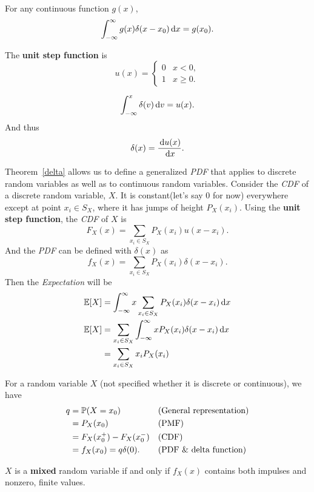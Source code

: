 \begin{theorem}
    For any continuous function $g(x)$,
    \[\int_{-\infty}^{\infty}g(x)\delta(x-x_0)\,\mathrm{d} x = g(x_0).\]
\end{theorem}

\begin{definition}
    The \textbf{unit step function} is
    \[u(x)={
        \begin{cases}
            0 & x<0, \\
            1 & x\geq 0.
        \end{cases}
    }\]
\end{definition}

\begin{theorem}\label{delta}
    \[\int_{-\infty}^{x}\delta(v)\,\mathrm{d} v = u(x).\]
    And thus
    \[\delta(x)=\frac{\,\mathrm{d} u(x)}{\,\mathrm{d} x}.\]
\end{theorem}

\begin{corollary}
    Theorem~\eqref{delta} allows us to define a generalized \emph{PDF} that applies to discrete random variables as well as to continuous random variables. Consider the \emph{CDF} of a discrete random variable, $X$. It is constant(let's say $0$ for now) everywhere except at point $x_i\in S_X$, where it has jumps of height $P_X(x_i)$. Using the \textbf{unit step function}, the \emph{CDF} of $X$ is 
    \[F_X(x)=\sum_{x_i\in S_X} P_X(x_i)u(x-x_i).\]
    And the \emph{PDF} can be defined with $\delta(x)$ as
    \[f_X(x)=\sum_{x_i\in S_X}P_X(x_i)\delta(x-x_i).\]
    Then the \emph{Expectation} will be
    \begin{align*}
        \E{X} &= \int_{-\infty}^{\infty}x\sum_{x_i\in S_X}P_X(x_i)\delta(x-x_i)\diff x \\
        \E{X} &= \sum_{x_i\in S_X}\int_{-\infty}^{\infty}xP_X(x_i)\delta(x-x_i)\diff x \\
        &= \sum_{x_i\in S_X}x_iP_X(x_i)
    \end{align*}
\end{corollary}

\begin{theorem}
    For a random variable $X$ (not specified whether it is discrete or continuous), we have 
    \begin{align*}
        q
        &= \P{X=x_0} && \text{(General representation)} \\
        &= P_X(x_0) && \text{(PMF)} \\
        &= F_X(x_0^+) - F_X(x_0^-) && \text{(CDF)} \\
        &= f_X(x_0) = q\delta(0). && \text{(PDF \& delta function)}
    \end{align*}
\end{theorem}

\begin{theorem}
    $X$ is a \textbf{mixed} random variable if and only if $f_X(x)$ contains both impulses and nonzero, finite values.
\end{theorem}